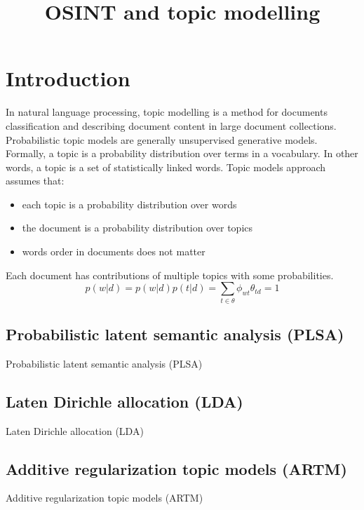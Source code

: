 \documentclass{article}
\title {OSINT and topic modelling}
\begin{document}
\maketitle
\section {Introduction}
In natural language processing, topic modelling is a method for documents classification and describing document content in large document collections. Probabilistic topic models are generally unsupervised generative models. Formally, a topic is a probability distribution over terms in a vocabulary. In other words, a topic is a set of statistically linked words.
Topic models approach assumes that:
\begin{itemize}
\item each topic is a probability distribution over words
\item the document is a probability distribution over topics
\item words order in documents does not matter
\end{itemize}
Each document has contributions of multiple topics with some probabilities.
$$p(w|d)=p(w|d)p(t|d)=\sum_{t \in \theta} \phi_{wt} \theta_{td} = 1$$

\subsection {Probabilistic latent semantic analysis (PLSA)}
Probabilistic latent semantic analysis (PLSA)
\subsection {Laten Dirichle allocation (LDA)}
Laten Dirichle allocation (LDA)
\subsection {Additive regularization topic models (ARTM)}
Additive regularization topic models (ARTM)
\end{document}
